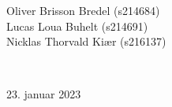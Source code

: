 \begin{titlepage}
\begin{minipage}{0.5\textwidth}
        \begin{flushleft}
            \centering
            \large
            
            Oliver Brisson Bredel (s214684) \\[0.2cm]
            Lucas Loua Buhelt (s214691) \\[0.2cm]
            Nicklas Thorvald Kiær (s216137) \\[0.2cm]
        \end{flushleft}
\end{minipage}
\\[1cm]
\vfill \vfill

{\large 23. januar 2023}

\vfill

\end{titlepage}
